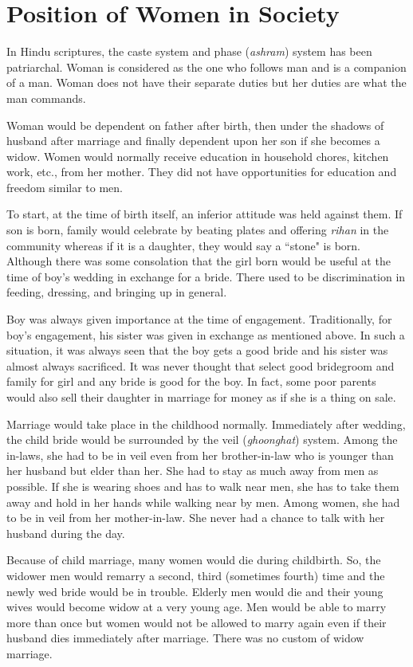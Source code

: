 \chapter{Position of Women in Society}
In Hindu scriptures, the caste system and phase (\textit{ashram}) system has
been patriarchal. Woman is considered as the one who follows man and is a
companion of a man. Woman does not have their separate duties but her duties
are what the man commands.

Woman would be dependent on father after birth, then under the shadows of
husband after marriage and finally dependent upon her son if she becomes a
widow. Women would normally receive education in household chores, kitchen
work, etc., from her mother. They did not have opportunities for education and
freedom similar to men.

To start, at the time of birth itself, an inferior attitude was held against
them. If son is born, family would celebrate by beating plates and offering
\textit{rihan} in the community whereas if it is a daughter, they would say a
``stone" is born. Although there was some consolation that the girl born would
be useful at the time of boy's wedding in exchange for a bride. There used to
be discrimination in feeding, dressing, and bringing up in general.

Boy was always given importance at the time of engagement. Traditionally, for
boy's engagement, his sister was given in exchange as mentioned above. In such
a situation, it was always seen that the boy gets a good bride and his sister
was almost always sacrificed. It was never thought that select good bridegroom and
family for girl and any bride is good for the boy. In fact, some poor parents
would also sell their daughter in marriage for money as if she is a thing on
sale.

Marriage would take place in the childhood normally. Immediately after wedding,
the child bride would be surrounded by the veil (\textit{ghoonghat}) system. Among
the in-laws, she had to be in veil even from her brother-in-law who is younger
than her husband but elder than her. She had to stay as much away from men as
possible. If she is wearing shoes and has to walk near men, she has to take
them away and hold in her hands while walking near by men. Among women, she had
to be in veil from her mother-in-law. She never had a chance to talk with her
husband during the day.

Because of child marriage, many women would die during childbirth. So, the
widower men would remarry a second, third (sometimes fourth) time and the newly
wed bride would be in trouble. Elderly men would die and their young wives
would become widow at a very young age. Men would be able to marry more than
once but women would not be allowed to marry again even if their husband dies
immediately after marriage. There was no custom of widow marriage.

